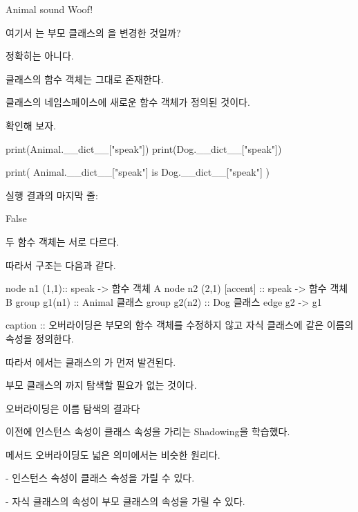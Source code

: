 \begin{dhkzsh}
Animal sound
Woof!
\end{dhkzsh}

여기서 는 부모 클래스의 을 변경한 것일까?

정확히는 아니다.

 클래스의  함수 객체는 그대로 존재한다.

 클래스의 네임스페이스에 새로운  함수 객체가 정의된 것이다.

확인해 보자.

\begin{dhkcode}
print(Animal.__dict__["speak"])
print(Dog.__dict__["speak"])

print(
    Animal.__dict__["speak"] is Dog.__dict__["speak"]
)
\end{dhkcode}

실행 결과의 마지막 줄:

\begin{dhkzsh}
False
\end{dhkzsh}

두 함수 객체는 서로 다르다.

따라서 구조는 다음과 같다.

\begin{dhkgraph}
node n1 (1,1):: speak -> 함수 객체 A
node n2 (2,1) [accent] :: speak -> 함수 객체 B
group g1(n1) :: Animal 클래스
group g2(n2) :: Dog 클래스 
edge g2 -> g1

caption :: 오버라이딩은 부모의 함수 객체를 수정하지 않고 자식 클래스에 같은 이름의 속성을 정의한다.
\end{dhkgraph}

따라서 에서는 클래스의 가 먼저 발견된다.

부모 클래스의 까지 탐색할 필요가 없는 것이다.

\begin{dhknote}
\begin{dhksmry}[centered]
오버라이딩은 이름 탐색의 결과다
\end{dhksmry}
\end{dhknote}

이전에 인스턴스 속성이 클래스 속성을 가리는 Shadowing을 학습했다.

메서드 오버라이딩도 넓은 의미에서는 비슷한 원리다.

\begin{dhksmry}
    - 인스턴스 속성이 클래스 속성을 가릴 수 있다.

    - 자식 클래스의 속성이 부모 클래스의 속성을 가릴 수 있다.
\end{dhksmry}

